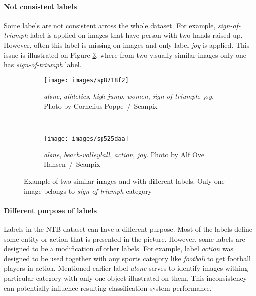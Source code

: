 \paragraph{Not consistent labels}
Some labels are not consistent across the whole dataset. For example, \textit{sign-of-triumph} label is applied on images that have person with two hands raised up. However, often this label is missing on images and only label \textit{joy} is applied. This issue is illustrated on Figure \ref{fig:sign-of-triumph-example}, where from two visually similar images only one has \textit{sign-of-triumph} label.

\begin{figure}[ht]
    \centering
    \begin{subfigure}[a]{0.3\textwidth}
        \texttt{[image: images/sp8718f2]}
        \caption{\textit{alone}, \textit{athletics}, \textit{high-jump}, \textit{women}, \textit{sign-of-triumph}, \textit{joy}. Photo by Cornelius Poppe~/~Scanpix}
        \label{fig:with-sign-of-triumph}
    \end{subfigure}
    ~
    \begin{subfigure}[a]{0.3\textwidth}
        \texttt{[image: images/sp525daa]}
        \caption{\textit{alone}, \textit{beach-volleyball}, \textit{action}, \textit{joy}. Photo by Alf Ove Hansen~/~Scanpix}
        \label{fig:without-sign-of-triumph}
    \end{subfigure}
    \caption[Example of two similar images and with different labels]{Example of two similar images and with different labels. Only one image belongs to \textit{sign-of-triumph} category}
    \label{fig:sign-of-triumph-example}
\end{figure}

\paragraph{Different purpose of labels}
Labels in the NTB dataset can have a different purpose. Most of the labels define some entity or action that is presented in the picture. However, some labels are designed to be a modification of other labels. For example, label \textit{action} was designed to be used together with any sports category like \textit{football} to get football players in action. Mentioned earlier label \textit{alone} serves to identify images withing particular category with only one object illustrated on them. This inconsistency can potentially influence resulting classification system performance.

